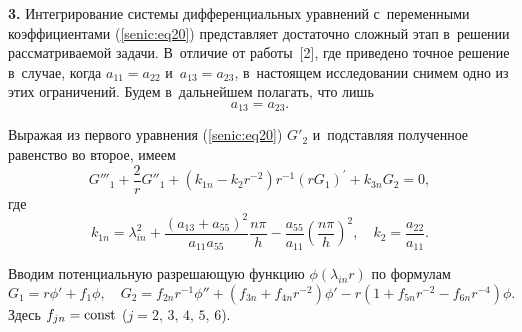 \textbf{3.} Интегрирование системы дифференциальных уравнений с~переменными 
коэффициентами (\ref{senic:eq20}) представляет достаточно сложный этап в~решении 
рассматриваемой задачи. В~отличие от работы~[2], где приведено точное 
решение в~случае, когда $a_{11} = a_{22} $ и~$a_{13} = a_{23} $, в~настоящем 
исследовании снимем одно из этих ограничений. Будем в~дальнейшем полагать, 
что лишь
\begin{equation}
\label{senic:eq22}
a_{13} = a_{23}.
\end{equation}


Выражая из первого уравнения (\ref{senic:eq20}) ${G}'_2 $ и~подставляя полученное 
равенство во второе, имеем
\begin{equation}
\label{senic:eq23}
{G}'''_1 + \frac{2}{r}{G}''_1 + \left( {k_{1n} - k_2 r^{ - 2}} \right)r^{ - 
1}\left( {rG_1 } \right)^\prime + k_{3n} G_2 = 0,
\end{equation}
где
\begin{equation}
\label{senic:eq24}
k_{1n} = \lambda _{in}^2 + \frac{\left( {a_{13} + a_{55} } \right)^2}{a_{11} 
a_{55} }\frac{n\pi }{h} - \frac{a_{55} }{a_{11} }\left( {\frac{n\pi }{h}} 
\right)^2,\quad
k_2 = \frac{a_{22} }{a_{11} }.
\end{equation}

Вводим потенциальную разрешающую функцию $\phi \left( {\lambda _{in} r} 
\right)$ по формулам 
\begin{equation}
G_1 = r{\phi }' + f_1 \phi,\quad G_2 = f_{2n} r^{ - 1}{\phi 
}'' + \left( {f_{3n} + f_{4n} r^{ - 2}} \right){\phi }' - r\left( {1 + 
f_{5n} r^{ - 2} - f_{6n} r^{ - 4}} \right)\phi .
\end{equation}
Здесь $f_{jn} = \rm const$ ($j = 2,\,3,\,4,\,5,\,6$).

